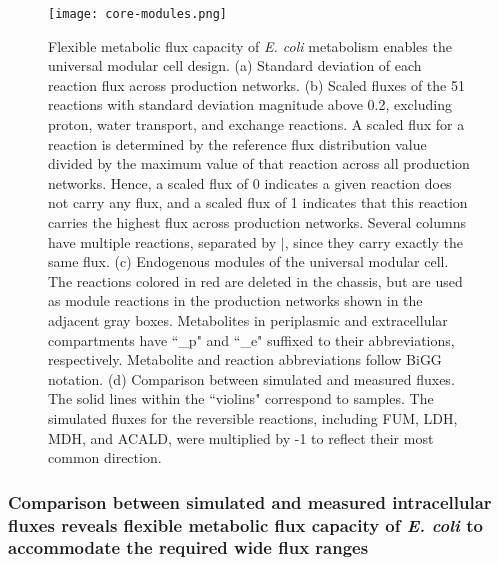 %
\begin{figure}[!hp]
    \caption[Flexible metabolic flux capacity of \textit{E. coli} metabolism enables the universal modular cell design]{Flexible metabolic flux capacity of \textit{E. coli} metabolism enables the universal modular cell design. (a) Standard deviation of each reaction flux  across production networks. (b) Scaled fluxes of the 51 reactions with standard deviation magnitude above 0.2,  excluding proton, water transport, and exchange reactions. A scaled flux for a reaction is determined by the reference flux distribution value divided by the maximum value of that reaction across all production networks. Hence, a scaled flux of 0 indicates a given reaction does not carry any flux, and a scaled flux of 1 indicates that this reaction carries the highest flux across production networks.  Several columns have multiple reactions, separated by $\vert$, since they carry exactly the same flux. (c) Endogenous modules of the universal modular cell.  The reactions colored in red are deleted in the chassis, but are used as module reactions in the production networks shown in the adjacent gray boxes. Metabolites in periplasmic and extracellular compartments have ``\_p" and ``\_e" suffixed to their abbreviations, respectively. Metabolite and reaction abbreviations follow BiGG\citep{king2015} notation.  (d) Comparison between simulated and measured fluxes. The solid lines within the ``violins" correspond to samples. The simulated fluxes for the  reversible reactions, including FUM, LDH, MDH, and ACALD, were multiplied by -1 to reflect their most common direction.
    }%
    \centering
    \texttt{[image: core-modules.png]}
    \label{fig5:core-modules}
\end{figure}

\subsubsection{Comparison between simulated and measured intracellular fluxes reveals flexible metabolic flux capacity of \textit{E. coli} to accommodate the required wide flux ranges} \label{sec:flux_comparison}

